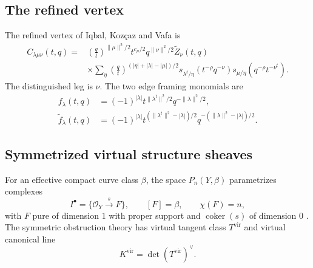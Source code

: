 \documentclass{amsart}
\theoremstyle{definition}
\numberwithin{equation}{section}
\newcommand{\cO}{\mathcal O}
\begin{document}
\subsection{The refined vertex}
The refined vertex of Iqbal, Koz\c{c}az and Vafa \cite[Section~4]{IqbalKozcazVafa} is
\begin{equation}
\begin{aligned}
 C_{\lambda\mu\nu}(t,q)
 ={}&\left(\frac qt\right)^{\|\mu\|^2/2}
 t^{c_\mu/2}q^{\|\nu\|^2/2}\widetilde Z_\nu(t,q)\\
 &\times\sum_\eta
 \left(\frac qt\right)^{(|\eta|+|\lambda|-|\mu|)/2}
 s_{\lambda^t/\eta}(t^{-\rho}q^{-\nu})
 s_{\mu/\eta}(q^{-\rho}t^{-\nu^t}).
\end{aligned}
\label{eq:refined-vertex-definition}
\end{equation}
The distinguished leg is \(\nu\).  The two edge framing monomials are
\begin{equation}
\begin{aligned}
 f_\lambda(t,q)
 &=(-1)^{|\lambda|}
 t^{\|\lambda^t\|^2/2}q^{-\|\lambda\|^2/2},\\
 \widetilde f_\lambda(t,q)
 &=(-1)^{|\lambda|}
 t^{(\|\lambda^t\|^2-|\lambda|)/2}
 q^{-(\|\lambda\|^2-|\lambda|)/2}.
\end{aligned}
\label{eq:modified-framing}
\end{equation}


\subsection{Symmetrized virtual structure sheaves}
For an effective compact curve class \(\beta\), the space \(P_n(Y,\beta)\) parametrizes complexes
\[
 I^\bullet=\{\cO_Y\xrightarrow{s}F\},\qquad
 [F]=\beta,\qquad \chi(F)=n,
\]
with \(F\) pure of dimension \(1\) with proper support and \(\operatorname{coker}(s)\) of dimension \(0\) \cite{PandharipandeThomasStablePairs}.  The symmetric obstruction theory has virtual tangent class \(T^{\mathrm{vir}}\) and virtual canonical line
\[
 K^{\mathrm{vir}}=\det(T^{\mathrm{vir}})^\vee.
\]
\end{document}
